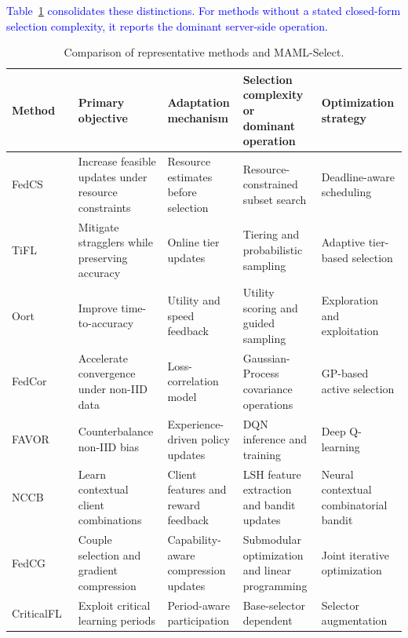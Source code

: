 \documentclass[journal]{IEEEtran}
\newcommand{\revision}[1]{\textcolor{blue}{#1}}
\begin{document}
\revision{Table~\ref{tab:related_work_comparison} consolidates these distinctions. For methods without a stated closed-form selection complexity, it reports the dominant server-side operation.}

\begin{table}[!t]
    \color{blue}
    \caption{Comparison of representative methods and MAML-Select.}
    \label{tab:related_work_comparison}
    \centering
    \scriptsize
    \setlength{\tabcolsep}{3pt}
    \renewcommand{\arraystretch}{0.98}
    \begin{tabularx}{\textwidth}{lXXXX}
        \toprule
        \textbf{Method} & \textbf{Primary objective} & \textbf{Adaptation mechanism} & \textbf{Selection complexity or dominant operation} & \textbf{Optimization strategy} \\
        \midrule
        FedCS~\cite{nishio2019client} & Increase feasible updates under resource constraints & Resource estimates before selection & Resource-constrained subset search & Deadline-aware scheduling \\
        TiFL~\cite{chai2020tifl} & Mitigate stragglers while preserving accuracy & Online tier updates & Tiering and probabilistic sampling & Adaptive tier-based selection \\
        Oort~\cite{lai2021oort} & Improve time-to-accuracy & Utility and speed feedback & Utility scoring and guided sampling & Exploration and exploitation \\
        FedCor~\cite{tang2022fedcor} & Accelerate convergence under non-IID data & Loss-correlation model & Gaussian-Process covariance operations & GP-based active selection \\
        FAVOR~\cite{wang2020optimizing} & Counterbalance non-IID bias & Experience-driven policy updates & DQN inference and training & Deep Q-learning \\
        NCCB~\cite{pan2024contextual} & Learn contextual client combinations & Client features and reward feedback & LSH feature extraction and bandit updates & Neural contextual combinatorial bandit \\
        FedCG~\cite{xu2024federated} & Couple selection and gradient compression & Capability-aware compression updates & Submodular optimization and linear programming & Joint iterative optimization \\
        CriticalFL~\cite{yan2023criticalfl} & Exploit critical learning periods & Period-aware participation & Base-selector dependent & Selector augmentation \\

\end{tabularx}
\end{table}
\end{document}
